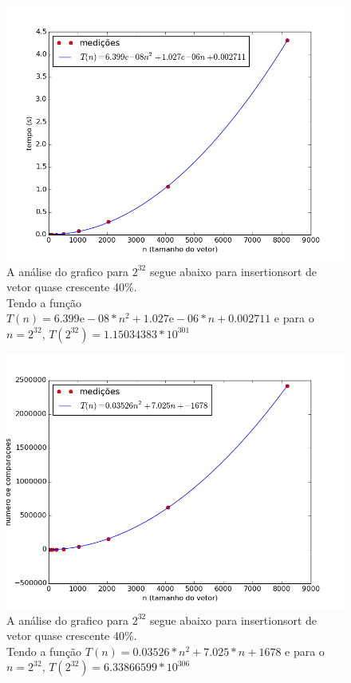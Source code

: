 \documentclass[12pt,a4paper,twoside]{report}
\begin{document}


\begin{figure}[ht]
\centering \includegraphics[scale=0.8]{../insertionsort/imagens/insertionsortQuaseCresc400.png}
\caption{A análise do grafico para $2^{32}$ segue abaixo para insertionsort de vetor quase crescente 40\%.\\
Tendo a função $T(n) = 6.399\mathrm{e}-08*n^2+1.027\mathrm{e}-06*n+0.002711$ e para o $n =2^{32}$, $T(2^{32}) = 1.15034383 * 10^{301}$}
\label{fig:insertionsortQuaseCresc400}
\end{figure}

\begin{figure}[ht]
\centering \includegraphics[scale=0.8]{../insertionsort/imagens/insertionsortQuaseCresc401.png}
\caption{A análise do grafico para $2^{32}$ segue abaixo para insertionsort de vetor quase crescente 40\%.\\
Tendo a função $T(n) = 0.03526*n^2+7.025*n+1678$ e para o $n =2^{32}$, $T(2^{32}) = 6.33866599 * 10^{306}$}
\label{fig:insertionsortQuaseCresc401}
\end{figure}
\end{document}

